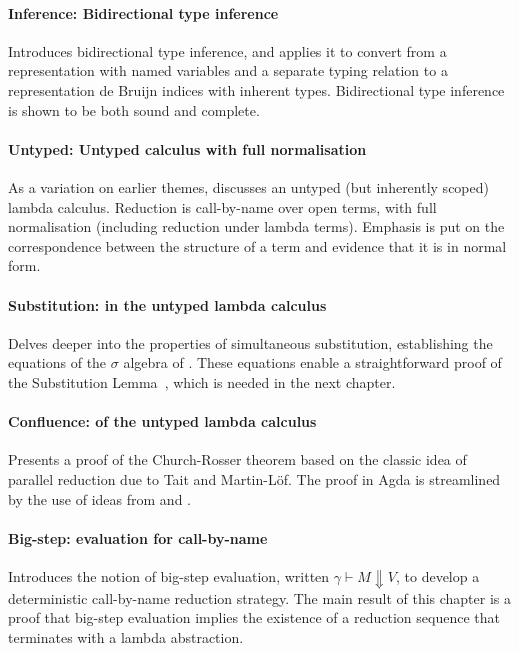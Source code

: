 \documentclass[preprint,authoryear]{elsarticle}
\begin{document}
\paragraph{Inference: Bidirectional type inference}
Introduces bidirectional type inference, and applies it to convert from
a representation with named variables and a separate typing relation
to a representation de Bruijn indices with inherent types. Bidirectional
type inference is shown to be both sound and complete.

\paragraph{Untyped: Untyped calculus with full normalisation}
As a variation on earlier themes, discusses an untyped (but inherently
scoped) lambda calculus.  Reduction is call-by-name over open terms,
with full normalisation (including reduction under lambda terms).  Emphasis
is put on the correspondence between the structure of a term and
evidence that it is in normal form.

\paragraph{Substitution: in the untyped lambda calculus}
Delves deeper into the properties of simultaneous substitution,
establishing the equations of the $\sigma$ algebra of
\citet{Abadi-1991}. These equations enable a straightforward proof of
the Substitution Lemma~\citep{Barendregt-1984}, which is needed in the
next chapter.

\paragraph{Confluence: of the untyped lambda calculus}
Presents a proof of the Church-Rosser theorem based on the classic
idea of parallel reduction due to Tait and Martin-L\"of. The proof in
Agda is streamlined by the use of ideas from
\citet{Schafer-Tebbi-Smolka-2015} and \citet{Pfenning-1992}.

\paragraph{Big-step: evaluation for call-by-name}
Introduces the notion of big-step evaluation, written $\gamma \vdash M
\Downarrow V$, to develop a deterministic call-by-name reduction
strategy. The main result of this chapter is a proof that big-step
evaluation implies the existence of a reduction sequence that
terminates with a lambda abstraction.
\end{document}

